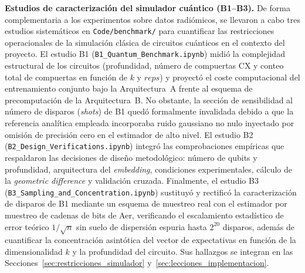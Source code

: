 \textbf{Estudios de caracterización del simulador cuántico (B1--B3).} De forma complementaria a los experimentos sobre datos radiómicos,
se llevaron a cabo tres estudios sistemáticos en \texttt{Code/}\allowbreak\texttt{benchmark/} para cuantificar las restricciones operacionales de la simulación
clásica de circuitos cuánticos en el contexto del proyecto. El estudio B1 (\texttt{B1\_Quantum\_Benchmark.ipynb}) midió la complejidad
estructural de los circuitos (profundidad, número de compuertas CX y conteo total de compuertas en función de $k$ y $reps$) y proyectó
el coste computacional del entrenamiento conjunto bajo la Arquitectura~A frente al esquema de precomputación de la Arquitectura~B.
No obstante, la sección de sensibilidad al número de disparos (\textit{shots}) de B1 quedó formalmente invalidada debido a que la referencia
analítica empleada incorporaba ruido gaussiano no nulo inyectado por omisión de precisión cero en el estimador de alto nivel.
El estudio B2 (\texttt{B2\_Design\_Verifications.ipynb}) integró las comprobaciones empíricas que respaldaron las decisiones de diseño
metodológico: número de qubits y profundidad, arquitectura del \textit{embedding}, condiciones experimentales, cálculo de la \textit{geometric difference} y validación cruzada. Finalmente, el estudio B3 (\texttt{B3\_Sampling\_}\allowbreak\texttt{and\_Concentration.ipynb}) sustituyó y rectificó la caracterización
de disparos de B1 mediante un esquema de muestreo real con el estimador por muestreo de cadenas de bits de Aer, verificando el escalamiento
estadístico de error teórico $1/\sqrt{n}$ sin suelo de dispersión espuria hasta $2^{20}$ disparos, además de cuantificar la concentración
asintótica del vector de expectativas en función de la dimensionalidad $k$ y la profundidad del circuito. Sus hallazgos se integran en
las Secciones~\ref{sec:restricciones_simulador} y~\ref{sec:lecciones_implementacion}.

\endgroup
